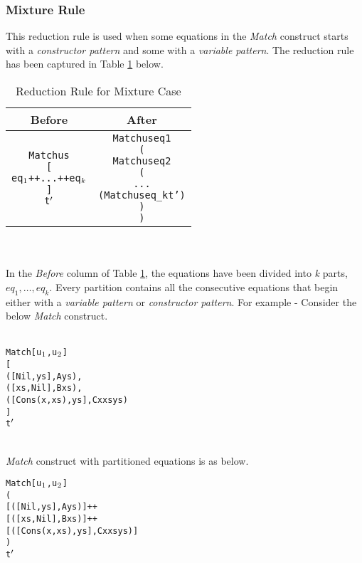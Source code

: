 \documentclass[11pt]{article}
\begin{document}
\subsubsection {Mixture Rule}
This reduction rule is used when some equations in the {\em Match} construct starts with a {\em constructor pattern} and some with a {\em variable pattern}. The reduction rule has been captured in Table \ref {mixRule} below.
~~\\
\begin{table}[h!]
\begin{center}
\begin{tabular}{|c|c|} \hline
{\bf Before} & {\bf After} \\ 
\hline
\begin{minipage}{3in}
\begin{alltt}

Match us  
         [
           eq\(\sb{1}\) ++ ... ++ eq\(\sb{k}\) 
         ]
         t\(\sp{\prime}\)  

\end{alltt} 
\end {minipage} &
\begin{minipage}{3in}
\begin{alltt}

Match us eq1 
  (
    Match us eq2
      (
       ...
         (Match us eq_k t')
      )
  )

\end{alltt} 
\end {minipage}
\tabularnewline
\hline
\end{tabular}
\caption{Reduction Rule for Mixture Case}
\label{mixRule}
\end{center}
\end{table}
~~\\~~\\ 
In the {\em Before} column of Table \ref {mixRule}, the equations have been divided into {\em k} parts, $eq_1,\ldots,eq_k$. Every partition contains all the consecutive equations that begin either with a {\em variable pattern} or {\em constructor pattern}. For example - Consider the below {\em Match} construct.   
~~\\~~\\ 
\begin{alltt}
        Match [u\(\sb{1}\),u\(\sb{2}\)]
            [
             ([Nil,ys],       A ys),
             ([xs,Nil],       B xs),
             ([Cons(x,xs),ys],C x xs ys)
            ]
          t\(\sp{\prime}\) 
\end{alltt} 
~~\\ 
{\em Match} construct with partitioned equations is as below.
\begin{alltt}
        Match [u\(\sb{1}\),u\(\sb{2}\)]
          (
            [([Nil,ys],       A ys)] ++
            [([xs,Nil],       B xs)] ++
            [([Cons(x,xs),ys],C x xs ys)]
          )  
          t\(\sp{\prime}\) 
\end{alltt} 
\end{document}
